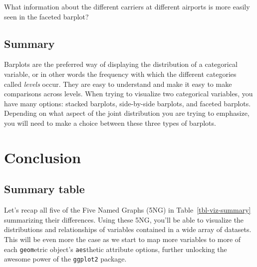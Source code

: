 \documentclass[
  letterpaper,
  DIV=11,
  numbers=noendperiod]{scrreprt}
\theoremstyle{definition}
\theoremstyle{remark}
\begin{document}
\begin{tcolorbox}[enhanced jigsaw, coltitle=black, toprule=.15mm, bottomtitle=1mm, breakable, leftrule=.75mm, title={{🎯} Learning Check 2.37}, opacitybacktitle=0.6, colback=white, rightrule=.15mm, opacityback=0, toptitle=1mm, colbacktitle=quarto-callout-tip-color!10!white, colframe=quarto-callout-tip-color-frame, titlerule=0mm, arc=.35mm, bottomrule=.15mm, left=2mm]
What information about the different carriers at different airports is
more easily seen in the faceted barplot?
\end{tcolorbox}

\hypertarget{summary-4}{%
\subsection{Summary}\label{summary-4}}

Barplots are the preferred way of displaying the distribution of a
categorical variable, or in other words the frequency with which the
different categories called \emph{levels} occur. They are easy to
understand and make it easy to make comparisons across levels. When
trying to visualize two categorical variables, you have many options:
stacked barplots, side-by-side barplots, and faceted barplots. Depending
on what aspect of the joint distribution you are trying to emphasize,
you will need to make a choice between these three types of barplots.

\hypertarget{sec-data-vis-conclusion}{%
\section{Conclusion}\label{sec-data-vis-conclusion}}

\hypertarget{summary-table}{%
\subsection{Summary table}\label{summary-table}}

Let's recap all five of the Five Named Graphs (5NG) in
Table~\ref{tbl-viz-summary} summarizing their differences. Using these
5NG, you'll be able to visualize the distributions and relationships of
variables contained in a wide array of datasets. This will be even more
the case as we start to map more variables to more of each
\texttt{geom}etric object's \texttt{aes}thetic attribute options,
further unlocking the awesome power of the \texttt{ggplot2} package.
\end{document}
